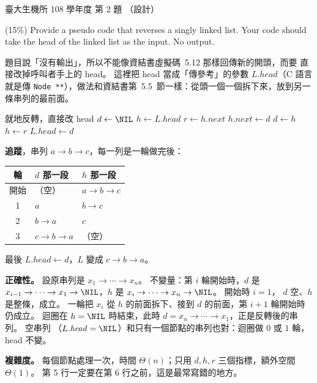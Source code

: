 \begin{pastexam}[label={px:ntu-108-bime-ds-02}]{臺大生機所 108 學年度 第 2 題}
（設計）

(15\%) Provide a pseudo code that reverses a singly linked list. Your code should take the head of
the linked list as the input. No output.
\end{pastexam}

\begin{pastsoln}
題目說「沒有輸出」，所以不能像資結書虛擬碼~5.12  那樣回傳新的開頭，而要
直接改掉呼叫者手上的 head。 這裡把 head 當成「傳參考」的參數 $L.\mathit{head}$（C 語言就是傳
\texttt{Node **}），做法和資結書第~5.5~節一樣：從頭一個一個拆下來，放到另一條串列的最前面。

\begin{pseudo}{就地反轉，直接改 head}
 
    \State $d \gets \NIL$ 
    \State $h \gets L.\mathit{head}$ 
        \State $r \gets h.\mathit{next}$ 
        \State $h.\mathit{next} \gets d$
        \State $d \gets h$
        \State $h \gets r$
    \EndWhile
    \State $L.\mathit{head} \gets d$
\EndProcedure
\end{pseudo}

\textbf{追蹤}，串列 $a \to b \to c$，每一列是一輪做完後：
\begin{center}
\begin{tabular}{cll}
\toprule
輪 & $d$ 那一段 & $h$ 那一段 \\
\midrule
開始 & （空） & $a \to b \to c$ \\
1 & $a$ & $b \to c$ \\
2 & $b \to a$ & $c$ \\
3 & $c \to b \to a$ & （空） \\
\bottomrule
\end{tabular}
\end{center}
最後 $L.\mathit{head} \gets d$，$L$ 變成 $c \to b \to a$。

\textbf{正確性。} 設原串列是 $x_1 \to \cdots \to x_n$。 不變量：第 $i$ 輪開始時，$d$ 是
$x_{i-1} \to \cdots \to x_1 \to \NIL$，$h$ 是 $x_i \to \cdots \to x_n \to \NIL$。 開始時 $i = 1$，
$d$ 空、$h$ 是整條，成立。 一輪把 $x_i$ 從 $h$ 的前面拆下、接到 $d$ 的前面，第 $i + 1$ 輪開始時
仍成立。 迴圈在 $h = \NIL$ 時結束，此時 $d = x_n \to \cdots \to x_1$，正是反轉後的串列。 空串列
（$L.\mathit{head} = \NIL$）和只有一個節點的串列也對：迴圈做 $0$ 或 $1$ 輪，head 不變。

\textbf{複雜度。} 每個節點處理一次，時間 $\Theta(n)$；只用 $d, h, r$ 三個指標，額外空間
$\Theta(1)$。 第 5 行一定要在第 6 行之前，這是最常寫錯的地方。
\end{pastsoln}
